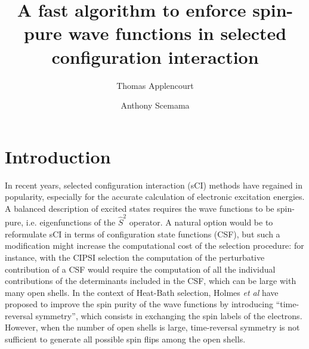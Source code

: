 \documentclass[aip,jcp,reprint,showkeys]{revtex4-1}
\newcommand{\stwo}{\hat{S}^2}
\begin{document}
\title{A fast algorithm to enforce spin-pure wave functions in selected configuration interaction}

\author{Thomas Applencourt}
\author{Anthony Scemama}

\begin{abstract}
\end{abstract}


\maketitle

\section{Introduction}

In recent years, selected configuration interaction (sCI) methods have regained in
popularity,\cite{Greer_1998,Stampfuss_2005,Bytautas_2009,Booth_2009,Giner_2013,Buenker_2014,Holmes_2016,Ohtsuka_2017,Coe_2018}
especially for the accurate calculation of electronic excitation
energies.\cite{Coe_2013,Schriber_2017,Holmes_2017,Loos_2018,Scemama_2018,Dash_2018}
A balanced description of excited states requires the wave functions to be
spin-pure, i.e. eigenfunctions of the $\stwo$ operator.
A natural option would be to reformulate sCI in terms of configuration state
functions (CSF), but such a modification might increase the computational cost
of the selection procedure: for instance, with the CIPSI
selection\cite{Bender_1969,Whitten_1969,Huron_1973} the computation of the
perturbative contribution of a CSF would require the computation of all the
individual contributions of the determinants included in the CSF, which can
be large with many open shells.
In the context of Heat-Bath selection, Holmes \textit{et al} have proposed to
improve the spin purity of the wave functions by introducing ``time-reversal
symmetry''\cite{Holmes_2017}, which consists in exchanging the spin labels of
the electrons.
However, when the number of open shells is large, time-reversal symmetry is not
sufficient to generate all possible spin flips among the open shells.
\end{document}
